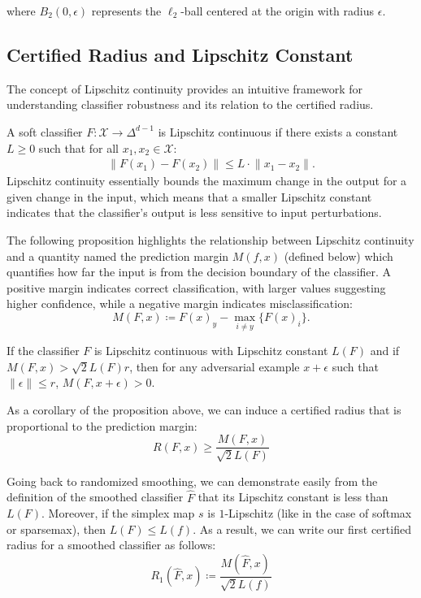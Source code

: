 where $B_2(0,\epsilon)$ represents the $\ell_2$-ball centered at the origin with radius $\epsilon$.

\subsection{Certified Radius and Lipschitz Constant}\label{subsec:certified-radius-and-lipschitz-constant}

The concept of Lipschitz continuity provides an intuitive framework for understanding classifier robustness and its relation to the certified radius.

A soft classifier $F: \mathcal{X} \rightarrow \Delta^{d-1}$ is Lipschitz continuous if there exists a constant $L \geq 0$ such that for all $x_1, x_2 \in \mathcal{X}$:
\begin{align*}
    \lVert F(x_1)- F(x_2) \rVert \leq L \cdot \lVert  x_1- x_2\rVert.
\end{align*}
Lipschitz continuity essentially bounds the maximum change in the output for a given change in the input, which means that a smaller Lipschitz constant indicates that the classifier's output is less sensitive to input perturbations.

The following proposition highlights the relationship between Lipschitz continuity and a quantity named the prediction margin $M(f,x)$ (defined below) which quantifies how far the input is from the decision boundary of the classifier.
A positive margin indicates correct classification, with larger values suggesting higher confidence, while a negative margin indicates misclassification:
\[
    M(F,x) \coloneqq F(x)_{y} - \max_{i \neq y}\{F(x)_i\}.
\]
\begin{proposition}
    If the classifier $F$ is Lipschitz continuous with Lipschitz constant $L(F)$ and if $M(F,x)>\sqrt{2}L(F)r$, then for any adversarial example $x+\epsilon$ such that $\lVert \epsilon \rVert\leq r$, $M(F,x+\epsilon)>0$.
\end{proposition}

As a corollary of the proposition above, we can induce a certified radius that is proportional to the prediction margin:
\[
    R(F,x) \geq \frac{M(F,x)}{\sqrt{2}L(F)}
\]

Going back to randomized smoothing, we can demonstrate easily from the definition of the smoothed classifier $\hat{F}$ that its Lipschitz constant is less than $L(F)$.
Moreover, if the simplex map $s$ is $1$-Lipschitz (like in the case of softmax or sparsemax), then $L(F)\leq L(f)$.
As a result, we can write our first certified radius for a smoothed classifier as follows:
\[
    R_1(\hat{F},x) \coloneqq \frac{M(\hat{F},x)}{\sqrt{2}L(f)}
\]


